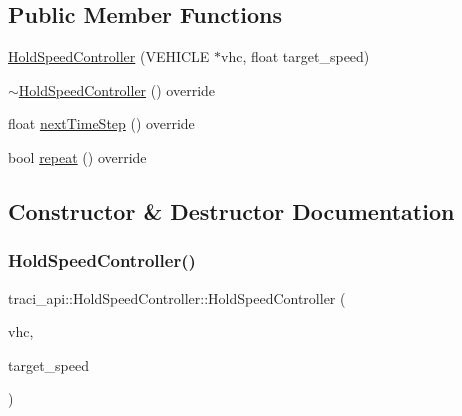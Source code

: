 \subsection*{Public Member Functions}
\begin{DoxyCompactItemize}
\item 
\hyperlink{classtraci__api_1_1_hold_speed_controller_a6f55b4ce8db084f9e279635cd56739a4}{Hold\+Speed\+Controller} (V\+E\+H\+I\+C\+LE $\ast$vhc, float target\+\_\+speed)
\item 
\hyperlink{classtraci__api_1_1_hold_speed_controller_a6e9fe04ec1ae839db1ebf2964923781c}{$\sim$\+Hold\+Speed\+Controller} () override
\item 
float \hyperlink{classtraci__api_1_1_hold_speed_controller_a61476bf22b8252d2a0badd2214b7357a}{next\+Time\+Step} () override
\item 
bool \hyperlink{classtraci__api_1_1_hold_speed_controller_acf2f2b8595dd8a135b13be736ee29d63}{repeat} () override
\end{DoxyCompactItemize}


\subsection{Constructor \& Destructor Documentation}
\mbox{\label{classtraci__api_1_1_hold_speed_controller_a6f55b4ce8db084f9e279635cd56739a4}} 
\subsubsection{\texorpdfstring{Hold\+Speed\+Controller()}{HoldSpeedController()}}
{\footnotesize\ttfamily traci\+\_\+api\+::\+Hold\+Speed\+Controller\+::\+Hold\+Speed\+Controller (\begin{DoxyParamCaption}\item[{V\+E\+H\+I\+C\+LE $\ast$}]{vhc,  }\item[{float}]{target\+\_\+speed }\end{DoxyParamCaption})\hspace{0.3cm}{\ttfamily [inline]}}

\mbox{\label{classtraci__api_1_1_hold_speed_controller_a6e9fe04ec1ae839db1ebf2964923781c}} 
